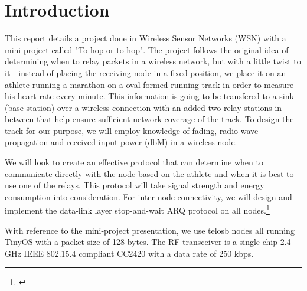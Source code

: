 \chapter{Introduction}\label{ch:introduction}

This report details a project done in Wireless Sensor Networks (WSN) with a mini-project called "To hop or to hop". The project follows the original idea of determining when to relay packets in a wireless network, but with a little twist to it - instead of placing the receiving node in a fixed position, we place it on an athlete running a marathon on a oval-formed running track in order to measure his heart rate every minute. This information is going to be transfered to a sink (base station) over a wireless connection with an added two relay stations in between that help ensure sufficient network coverage of the track. To design the track for our purpose, we will employ knowledge of fading, radio wave propagation and received input power (dbM) in a wireless node.

\noindent We will look to create an effective protocol that can determine when to communicate directly with the node based on the athlete and when it is best to use one of the relays. This protocol will take signal strength and energy consumption into consideration. For inter-node connectivity, we will design and implement the data-link layer stop-and-wait ARQ protocol on all nodes.\footnote{\cite{Ieee}}

\noindent With reference to the mini-project presentation, we use telosb nodes all running TinyOS with a packet size of 128 bytes. The RF transceiver is a single-chip 2.4 GHz IEEE 802.15.4 compliant CC2420 with a data rate of 250 kbps.


